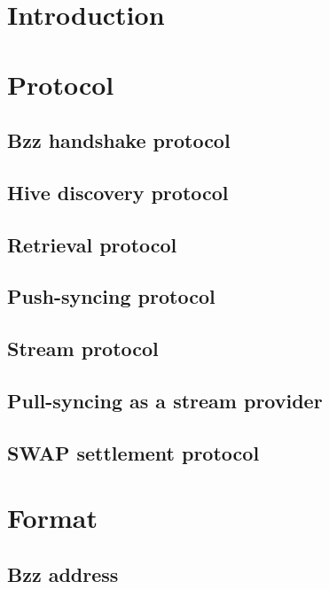 \chapter{Introduction}


\chapter{Protocol}
\section{Bzz  handshake protocol}\label{spec:protocol:bzz}

\section{Hive discovery protocol}\label{spec:protocol:hive}

\section{Retrieval protocol}\label{spec:protocol:retrieval}

\section{Push-syncing protocol}\label{spec:protocol:push-sync}

\section{Stream protocol}\label{spec:protocol:stream}

\section{Pull-syncing as a stream provider}\label{spec:protocol:pull-sync}

\section{SWAP settlement protocol}\label{spec:protocol:swap}


\chapter{Format}
\section{Bzz address}\label{spec:format:bzzaddress}

